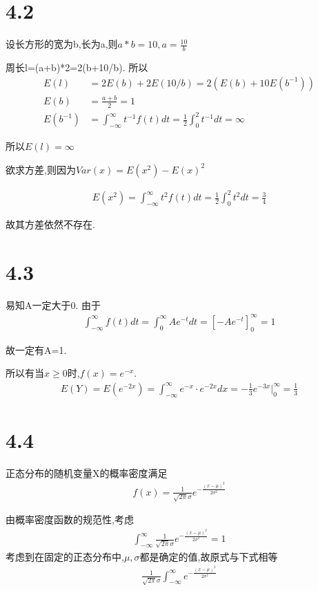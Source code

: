 \documentclass[12pt,a4paper,fontset=none]{ctexart}
\begin{document}
\section*{4.2}
设长方形的宽为b,长为a,则$a*b=10,a=\frac{10}{b} $

周长l=(a+b)*2=2(b+10/b).
所以\begin{align*}
    E(l)      & =2E(b)+2E(10/b)=2(E(b)+10E(b^{-1}))                                         \\
    E(b)      & =\frac{a+b}{2}=1                                                            \\
    E(b^{-1}) & =\int_{-\infty}^{\infty}t^{-1}f(t)dt=\frac{1}{2}\int_{0}^{2}t^{-1}dt=\infty
\end{align*}

所以$E(l)=\infty$

欲求方差,则因为$Var(x)=E(x^2)-E(x)^2$

\begin{align*}
    E(x^2)=\int_{-\infty}^{\infty}t^2f(t)dt=\frac{1}{2}\int_{0}^{2}t^2dt=\frac{3}{4}
\end{align*}

故其方差依然不存在.
\section*{4.3}
易知A一定大于0.
由于\begin{align*}
    \int_{-\infty}^{\infty}f(t)dt=\int_{0}^{\infty}Ae^{-t}dt=[-Ae^{-t}]_0^{\infty}=1
\end{align*}

故一定有A=1.

所以有当$x\geqslant 0$时,$f(x)=e^{-x}$.
\begin{align*}
    E(Y)=E(e^{-2x})=\int_{-\infty}^{\infty}e^{-x}\cdot e^{-2x}dx=-\frac{1}{3}e^{-3x}\bigg|_0^{\infty}=\frac{1}{3}
\end{align*}
\section*{4.4}
正态分布的随机变量X的概率密度满足
\begin{align*}
    f(x)=\frac{1}{\sqrt{2\pi}\sigma }e^{-\frac{(x-\mu )^2}{2\sigma^2} }
\end{align*}

由概率密度函数的规范性,考虑
\begin{align*}
    \int_{-\infty}^{\infty}\frac{1}{\sqrt{2\pi}\sigma }e^{-\frac{(x-\mu )^2}{2\sigma^2} }=1
\end{align*}
考虑到在固定的正态分布中,$\mu,\sigma$都是确定的值,故原式与下式相等
\begin{align*}
    \frac{1}{\sqrt{2\pi}\sigma }\int_{-\infty}^{\infty}e^{-\frac{(x-\mu )^2}{2\sigma^2} }
\end{align*}
\end{document}
